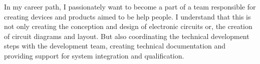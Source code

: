 



In my career path, I passionately want to become a part of a team responsible for creating devices and products aimed to be help people. I understand that this is not only creating the conception and design of electronic circuits or, the creation of circuit diagrams and layout. But also coordinating the technical development steps with the development team, creating technical documentation and providing support for system integration and qualification.